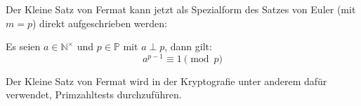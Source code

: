 \noindent
Der Kleine Satz von Fermat kann jetzt als Spezialform des Satzes von Euler (mit $m = p$) direkt
aufgeschrieben werden:

\begin{satz}
  Es seien $a \in \mathbb{N}^\times$ und $p \in \mathbb{P}$ mit $a \perp p$, dann gilt:
  \begin{equation*}
    a^{p-1} \equiv 1 \pmod{p}
  \end{equation*}
\end{satz}

\noindent
Der Kleine Satz von Fermat wird in der Kryptografie unter anderem dafür verwendet,
Primzahltests durchzuführen.